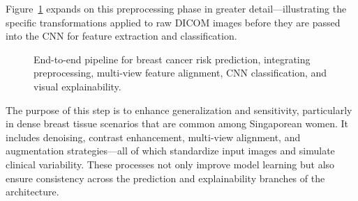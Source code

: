 \documentclass[12pt]{article}
\begin{document}
Figure~\ref{fig:end_to_end_pipeline} expands on this preprocessing phase in greater detail—illustrating the specific transformations applied to raw DICOM images before they are passed into the CNN for feature extraction and classification.

\begin{figure}[H]
    \centering
    \caption{End-to-end pipeline for breast cancer risk prediction, integrating preprocessing, multi-view feature alignment, CNN classification, and visual explainability.}
    \label{fig:end_to_end_pipeline}
\end{figure}

The purpose of this step is to enhance generalization and sensitivity, particularly in dense breast tissue scenarios that are common among Singaporean women. It includes denoising, contrast enhancement, multi-view alignment, and augmentation strategies—all of which standardize input images and simulate clinical variability. These processes not only improve model learning but also ensure consistency across the prediction and explainability branches of the architecture.
\end{document}
